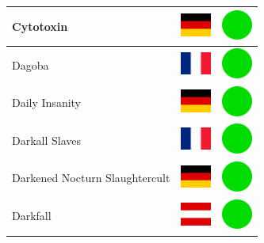 \documentclass[12pt, a4paper, twoside]{report}
\begin{document}
\begin{center}
\begin{longtable}{|p{5cm}|p{2cm}|p{2cm}|}
Cytotoxin & \includegraphics[width=1cm]{4x3/de} & \includegraphics[width=1cm]{likes/y} \\ \hline
Dagoba & \includegraphics[width=1cm]{4x3/fr} & \includegraphics[width=1cm]{likes/y} \\ \hline
Daily Insanity & \includegraphics[width=1cm]{4x3/de} & \includegraphics[width=1cm]{likes/y} \\ \hline
Darkall Slaves & \includegraphics[width=1cm]{4x3/fr} & \includegraphics[width=1cm]{likes/y} \\ \hline
Darkened Nocturn Slaughtercult & \includegraphics[width=1cm]{4x3/de} & \includegraphics[width=1cm]{likes/y} \\ \hline
Darkfall & \includegraphics[width=1cm]{4x3/at} & \includegraphics[width=1cm]{likes/y} \\ \hline

\end{longtable}
\end{center}
\end{document}
